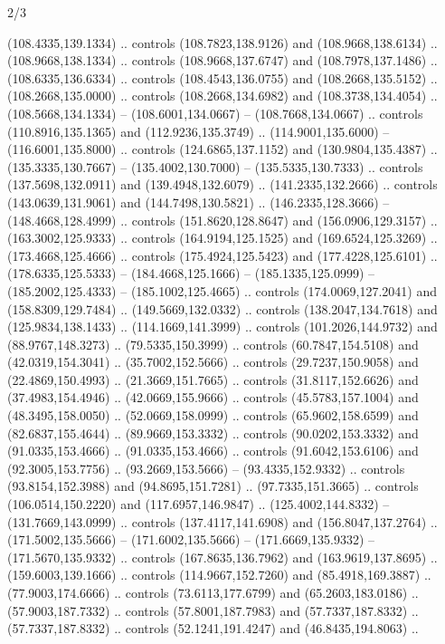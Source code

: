 \begin{flagdescription}{2/3}
\begin{scope}[xshift=0.5\flaglength,yshift=0.5\flagwidth,scale=\flagwidth/525.28]
\begin{scope}[y=0.1mm, x=0.1mm, yscale=-1,shift={(-381.5,-404)}]
\begin{scope}[shift={(5.25001,4.53053)},miter limit=4.00,line width=0.800\lw]
  (108.4335,139.1334) .. controls (108.7823,138.9126) and (108.9668,138.6134) ..
  (108.9668,138.1334) .. controls (108.9668,137.6747) and (108.7978,137.1486) ..
  (108.6335,136.6334) .. controls (108.4543,136.0755) and (108.2668,135.5152) ..
  (108.2668,135.0000) .. controls (108.2668,134.6982) and (108.3738,134.4054) ..
  (108.5668,134.1334) -- (108.6001,134.0667) -- (108.7668,134.0667) .. controls
  (110.8916,135.1365) and (112.9236,135.3749) .. (114.9001,135.6000) --
  (116.6001,135.8000) .. controls (124.6865,137.1152) and (130.9804,135.4387) ..
  (135.3335,130.7667) -- (135.4002,130.7000) -- (135.5335,130.7333) .. controls
  (137.5698,132.0911) and (139.4948,132.6079) .. (141.2335,132.2666) .. controls
  (143.0639,131.9061) and (144.7498,130.5821) .. (146.2335,128.3666) --
  (148.4668,128.4999) .. controls (151.8620,128.8647) and (156.0906,129.3157) ..
  (163.3002,125.9333) .. controls (164.9194,125.1525) and (169.6524,125.3269) ..
  (173.4668,125.4666) .. controls (175.4924,125.5423) and (177.4228,125.6101) ..
  (178.6335,125.5333) -- (184.4668,125.1666) -- (185.1335,125.0999) --
  (185.2002,125.4333) -- (185.1002,125.4665) .. controls (174.0069,127.2041) and
  (158.8309,129.7484) .. (149.5669,132.0332) .. controls (138.2047,134.7618) and
  (125.9834,138.1433) .. (114.1669,141.3999) .. controls (101.2026,144.9732) and
  (88.9767,148.3273) .. (79.5335,150.3999) .. controls (60.7847,154.5108) and
  (42.0319,154.3041) .. (35.7002,152.5666) .. controls (29.7237,150.9058) and
  (22.4869,150.4993) .. (21.3669,151.7665) .. controls (31.8117,152.6626) and
  (37.4983,154.4946) .. (42.0669,155.9666) .. controls (45.5783,157.1004) and
  (48.3495,158.0050) .. (52.0669,158.0999) .. controls (65.9602,158.6599) and
  (82.6837,155.4644) .. (89.9669,153.3332) .. controls (90.0202,153.3332) and
  (91.0335,153.4666) .. (91.0335,153.4666) .. controls (91.6042,153.6106) and
  (92.3005,153.7756) .. (93.2669,153.5666) -- (93.4335,152.9332) .. controls
  (93.8154,152.3988) and (94.8695,151.7281) .. (97.7335,151.3665) .. controls
  (106.0514,150.2220) and (117.6957,146.9847) .. (125.4002,144.8332) --
  (131.7669,143.0999) .. controls (137.4117,141.6908) and (156.8047,137.2764) ..
  (171.5002,135.5666) -- (171.6002,135.5666) -- (171.6669,135.9332) --
  (171.5670,135.9332) .. controls (167.8635,136.7962) and (163.9619,137.8695) ..
  (159.6003,139.1666) .. controls (114.9667,152.7260) and (85.4918,169.3887) ..
  (77.9003,174.6666) .. controls (73.6113,177.6799) and (65.2603,183.0186) ..
  (57.9003,187.7332) .. controls (57.8001,187.7983) and (57.7337,187.8332) ..
  (57.7337,187.8332) .. controls (52.1241,191.4247) and (46.8435,194.8063) ..

\end{scope}
\end{scope}
\end{scope}
\end{flagdescription}
